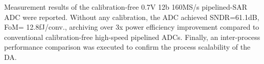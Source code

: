 Measurement results of the calibration-free 0.7V 12b 160MS/s pipelined-SAR ADC were reported. Without any calibration, the ADC achieved SNDR=61.1dB, FoM= 12.8fJ/conv., archiving over 3x power efficiency improvement compared to conventional calibration-free high-speed pipelined ADCs. Finally, an inter-process performance comparison was executed to confirm the process scalability of the DA.

